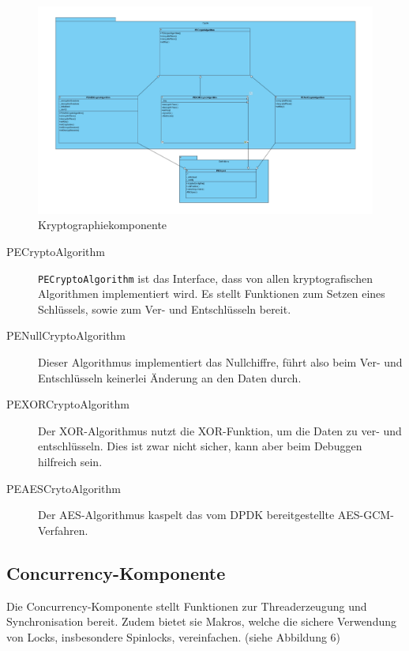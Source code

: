\documentclass[a4paper, 11pt, ngerman, fleqn]{article}
\begin{document}
\begin{figure}
	\begin{center}
		\includegraphics[width=1 \textwidth]{figures/Crypto.pdf}
		\caption{Kryptographiekomponente}
	\end{center}
\end{figure}

\begin{description}
	\item[PECryptoAlgorithm] 
	\texttt{PECryptoAlgorithm} ist das Interface, dass von allen kryptografischen Algorithmen implementiert wird. 
	Es stellt Funktionen zum Setzen eines Schlüssels, sowie zum Ver- und Entschlüsseln bereit.
	
	\item[PENullCryptoAlgorithm]
	Dieser Algorithmus implementiert das Nullchiffre, führt also beim Ver- und Entschlüsseln keinerlei Änderung an den Daten durch.
	
	\item[PEXORCryptoAlgorithm]
	Der XOR-Algorithmus nutzt die XOR-Funktion, um die Daten zu ver- und entschlüsseln.
	Dies ist zwar nicht sicher, kann aber beim Debuggen hilfreich sein.
	
	\item[PEAESCrytoAlgorithm]
	Der AES-Algorithmus kaspelt das vom DPDK bereitgestellte AES-GCM-Verfahren. 
\end{description}

\subsection{Concurrency-Komponente}
Die Concurrency-Komponente stellt Funktionen zur Threaderzeugung und Synchronisation bereit.
Zudem bietet sie Makros, welche die sichere Verwendung von Locks, insbesondere Spinlocks, vereinfachen. (siehe Abbildung 6)
\end{document}

